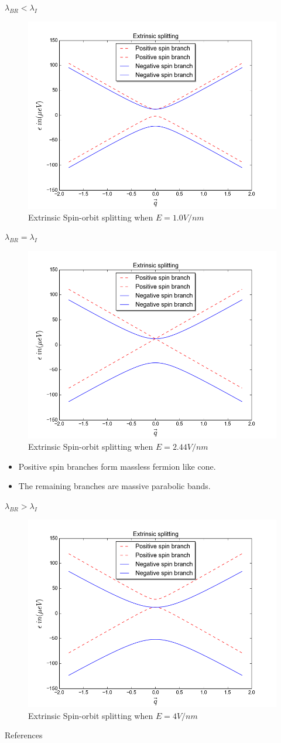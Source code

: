\documentclass[11pt]{beamer}
\begin{document}
\begin{frame}{$\lambda_{BR}<\lambda_I$}
\begin{figure}[h]
    \includegraphics[height=0.3\textwidth,width = .5\textwidth]{figure_2}
    \caption{Extrinsic Spin-orbit splitting when $E = 1.0 V/nm$}
\end{figure}
\end{frame}
\begin{frame}{$\lambda_{BR}=\lambda_I$}
\begin{figure}[h]
    \includegraphics[height=0.3\textwidth,width = .5\textwidth]{figure_3}
    \caption{Extrinsic Spin-orbit splitting when $E = 2.44 V/nm$}
\end{figure}
\begin{itemize}
    \item Positive spin branches form massless fermion like cone.
    \item The remaining branches are massive parabolic bands.
\end{itemize}

\end{frame}
\begin{frame}{$\lambda_{BR}>\lambda_I$}
\begin{figure}[h]
    \includegraphics[height=0.3\textwidth,width = .5\textwidth]{figure_4}
    \caption{Extrinsic Spin-orbit splitting when $E = 4 V/nm$}
\end{figure}
\end{frame}
\begin{frame}{References}
\printbibliography
\end{frame}
\end{document}
